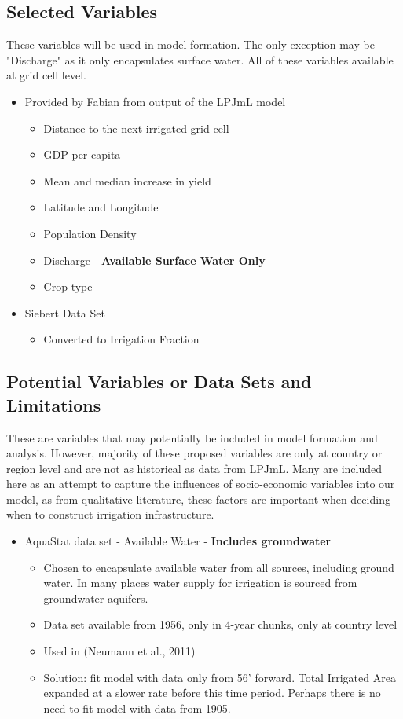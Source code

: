 \documentclass[12pt]{extarticle}
\begin{document}
\subsection{Selected Variables}
These variables will be used in model formation. The only exception may be "Discharge" as it only encapsulates surface water. All of these variables available at grid cell level. 
\begin{itemize}
   \item  Provided by Fabian from output of the LPJmL model
   \begin{itemize}
     \item  Distance to the next irrigated grid cell
     \item GDP per capita
     \item Mean and median increase in yield
     \item Latitude and Longitude
    \item Population Density
    \item Discharge - \textbf{Available Surface Water Only}
    \item Crop type
       \end{itemize}
     \end{itemize}
\begin{itemize}
   \item Siebert Data Set
   \begin{itemize}
     \item Converted to Irrigation Fraction
       \end{itemize}
     \end{itemize}   

\subsection{Potential Variables or Data Sets and Limitations}
These are variables that may potentially be included in model formation and analysis. However, majority of these proposed variables are only at country or region level and are not as historical as data from LPJmL. Many are included here as an attempt to capture the influences of socio-economic variables into our model, as from qualitative literature, these factors are important when deciding when to construct irrigation infrastructure. 
\begin{itemize}
   \item  AquaStat data set - Available Water - \textbf{Includes groundwater}
\begin{itemize}
    \item Chosen to encapsulate available water from all sources, including ground water. In many places water supply for irrigation is sourced from groundwater aquifers. 
    \item Data set available from 1956, only in 4-year chunks, only at country level
    \item Used in (Neumann et al., 2011)
    \item Solution: fit model with data only from 56' forward. Total Irrigated Area expanded at a slower rate before this time period. Perhaps there is no need to fit model with data from 1905.
        \end{itemize}   
       \end{itemize}
\end{document}
